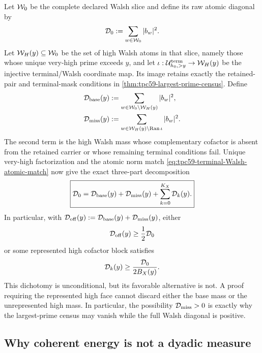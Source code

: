 Let \(\mathcal W_0\) be the complete declared Walsh slice and define its raw
atomic diagonal by
\begin{equation}
 \mathcal D_0:=\sum_{w\in\mathcal W_0}|b_w|^2.
 \label{eq:tpc59-full-declared-Walsh-diagonal}
\end{equation}
Let \(\mathcal W_H(y)\subseteq\mathcal W_0\) be the set of high Walsh atoms in that
slice, namely those whose unique very-high prime exceeds \(y\), and let
\(\iota:\mathcal U_{h_0,>y}^{\rm term}\to\mathcal W_H(y)\) be the injective
terminal/Walsh coordinate map.  Its image retains exactly the
retained-pair and terminal-mask conditions in
\cref{thm:tpc59-largest-prime-census}.  Define
\begin{align}
 \mathcal D_{\rm base}(y)
 &:=\sum_{w\in\mathcal W_0\setminus\mathcal W_H(y)}|b_w|^2,
 \label{eq:tpc59-base-Walsh-energy}\\
 \mathcal D_{\rm miss}(y)
 &:=\sum_{w\in\mathcal W_H(y)\setminus\operatorname{Ran}\iota}|b_w|^2.
 \label{eq:tpc59-missing-high-Walsh-energy}
\end{align}
The second term is the high Walsh mass whose complementary cofactor is
absent from the retained carrier or whose remaining terminal conditions
fail.  Unique very-high factorization and the atomic norm match
\eqref{eq:tpc59-terminal-Walsh-atomic-match} now give the exact
three-part decomposition
\begin{equation}
 \boxed{
 \mathcal D_0
 =\mathcal D_{\rm base}(y)+\mathcal D_{\rm miss}(y)
  +\sum_{k=0}^{K_X}\mathcal D_k(y).}
 \label{eq:tpc59-base-high-partition}
\end{equation}
In particular, with
\(\mathcal D_{\rm off}(y):=\mathcal D_{\rm base}(y)+\mathcal D_{\rm miss}(y)\), either
\begin{equation}
 \mathcal D_{\rm off}(y)\ge\frac12\mathcal D_0
 \label{eq:tpc59-base-dominates}
\end{equation}
or some represented high cofactor block satisfies
\begin{equation}
 \mathcal D_k(y)\ge\frac{\mathcal D_0}{2B_X(y)}.
 \label{eq:tpc59-high-block-dominates}
\end{equation}
This dichotomy is unconditional, but its favorable alternative is not.
A proof requiring the represented high face cannot discard either the
base mass or the unrepresented high mass.  In particular, the possibility
\(\mathcal D_{\rm miss}>0\) is exactly why the largest-prime census may vanish
while the full Walsh diagonal is positive.

\subsection{Why coherent energy is not a dyadic measure}

